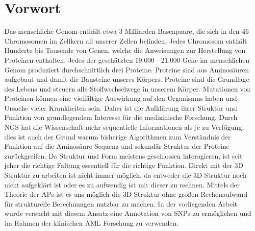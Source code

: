 \chapter{Vorwort}

Das menschliche Genom enthält etwa 3 Milliarden Basenpaare, die sich in den 46 Chromosomen im Zellkern all unserer Zellen befinden. Jedes Chromosom enthält Hunderte bis Tausende von Genen, welche die Anweisungen zur Herstellung von Proteinen enthalten. Jedes der geschätzten 19.000 - 21.000 Gene\cite{Ezkurdia.2014} im menschlichen Genom produziert durchschnittlich drei Proteine. Proteine sind aus Aminosäuren aufgebaut und damit die Bausteine unseres Körpers. Proteine sind die Grundlage des Lebens und steuern alle Stoffwechselwege in unserem Körper. Mutationen von Proteinen können eine vielfältige Auswirkung auf den Organismus haben und Ursache vieler Krankheiten sein. Daher ist die Aufklärung ihrer Struktur und Funktion von grundlegendem Interesse für die medizinische Forschung. 
Durch \ac{NGS} hat die Wissenschaft mehr sequentielle Informationen als je zu Verfügung, dies ist auch der Grund warum bisherige Algorithmen zum Verständnis der Funktion auf die Aminosäure Sequenz und sekundär Struktur der Proteine zurückgreifen. Da Struktur und Form meistens geschlossen interagieren, ist seit jeher die richtige Faltung essentiell für die richtige Funktion. Direkt mit der 3D Struktur zu arbeiten ist nicht immer möglich, da entweder die 3D Struktur noch nicht aufgeklärt ist oder es zu aufwendig ist mit dieser zu rechnen.
Mittels der Theorie der \ac{APs} ist es uns möglich die 3D Struktur ohne großen Rechenaufwand für strukturelle Berechnungen nutzbar zu machen. In der vorliegenden Arbeit wurde versucht mit diesem Ansatz eine Annotation von \ac{SNP}s zu ermöglichen und im Rahmen der klinischen \ac{AML} Forschung zu verwenden.
